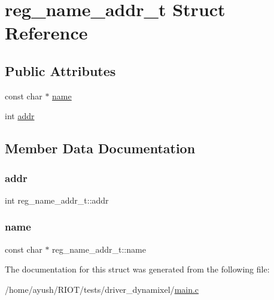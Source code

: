 \hypertarget{structreg__name__addr__t}{}\section{reg\+\_\+name\+\_\+addr\+\_\+t Struct Reference}
\label{structreg__name__addr__t}
\subsection*{Public Attributes}
\begin{DoxyCompactItemize}
\item 
const char $\ast$ \hyperlink{structreg__name__addr__t_a1852f823f5226876c48611e2b2a52201}{name}
\item 
int \hyperlink{structreg__name__addr__t_a781b4c4a4142641869d119d5cf081d3f}{addr}
\end{DoxyCompactItemize}


\subsection{Member Data Documentation}
\mbox{\label{structreg__name__addr__t_a781b4c4a4142641869d119d5cf081d3f}} 
\subsubsection{\texorpdfstring{addr}{addr}}
{\footnotesize\ttfamily int reg\+\_\+name\+\_\+addr\+\_\+t\+::addr}

\mbox{\label{structreg__name__addr__t_a1852f823f5226876c48611e2b2a52201}} 
\subsubsection{\texorpdfstring{name}{name}}
{\footnotesize\ttfamily const char $\ast$ reg\+\_\+name\+\_\+addr\+\_\+t\+::name}



The documentation for this struct was generated from the following file\+:\begin{DoxyCompactItemize}
\item 
/home/ayush/\+R\+I\+O\+T/tests/driver\+\_\+dynamixel/\hyperlink{driver__dynamixel_2main_8c}{main.\+c}\end{DoxyCompactItemize}

